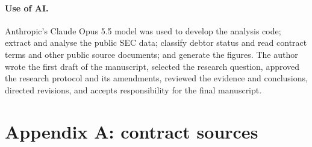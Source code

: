 \documentclass[11pt]{article}
\begin{document}
\paragraph{Use of AI.} Anthropic's Claude Opus 5.5 model was used to develop the analysis code;
extract and analyse the public SEC data; classify debtor status and read contract terms and other
public source documents; and generate the figures. The author wrote the first draft of the
manuscript, selected the research question, approved the research
protocol and its amendments, reviewed the evidence and conclusions, directed revisions, and accepts
responsibility for the final manuscript.

\clearpage
\appendix
\section*{Appendix A: contract sources}
\setcounter{table}{0}
\end{document}
